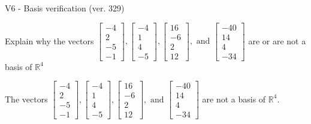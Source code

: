 \begin{exercise}
  \begin{exerciseTitle}V6 - Basis verification (ver. 329)\end{exerciseTitle}
  \begin{exerciseStatement}
    Explain why the vectors \(\left[\begin{array}{r}
-4 \\
2 \\
-5 \\
-1
\end{array}\right] , \left[\begin{array}{r}
-4 \\
1 \\
4 \\
-5
\end{array}\right] , \left[\begin{array}{r}
16 \\
-6 \\
2 \\
12
\end{array}\right] , \text{ and } \left[\begin{array}{r}
-40 \\
14 \\
4 \\
-34
\end{array}\right]\) are or are not a basis of \(\mathbb{R}^4\)	


  \end{exerciseStatement}
  \begin{exerciseAnswer}
   The vectors \(\left[\begin{array}{r}
-4 \\
2 \\
-5 \\
-1
\end{array}\right] , \left[\begin{array}{r}
-4 \\
1 \\
4 \\
-5
\end{array}\right] , \left[\begin{array}{r}
16 \\
-6 \\
2 \\
12
\end{array}\right] , \text{ and } \left[\begin{array}{r}
-40 \\
14 \\
4 \\
-34
\end{array}\right]\) 
  	 are not  a basis of \(\mathbb{R}^4\).
  


  \end{exerciseAnswer}
\end{exercise}